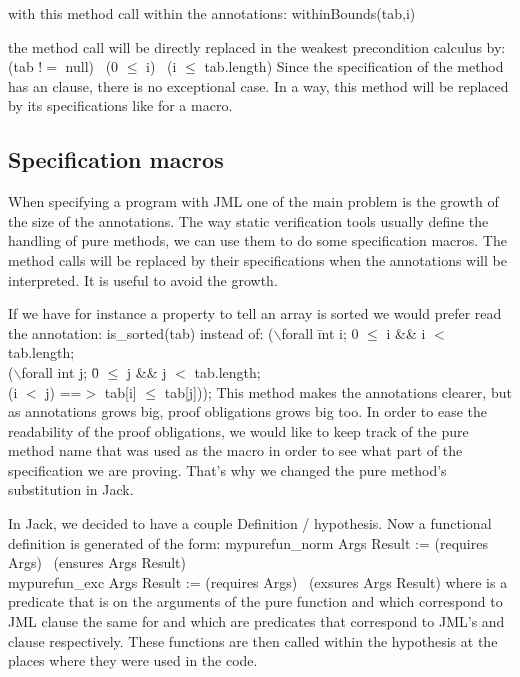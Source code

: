 with this method call within the annotations: 
\btab
withinBounds(tab,i)
\etab

the method call will be directly replaced in the weakest precondition calculus by:
\btab
(tab $!=$ null) \rarrow \ (0 $\le$ i) \conj \ (i $\le$ tab.length)
\etab
Since the specification
of the method has an  clause, there is no exceptional case.
In a way, this method will be replaced by its specifications like for a macro.



\subsection{Specification macros}


When specifying a program with JML one of the main problem is the 
growth of the size of the annotations. 
The way static verification tools usually define the handling 
of pure methods, we can use them to do some specification macros.
The method calls will be replaced by their specifications when the 
annotations will be interpreted. It is useful to avoid the growth.

If we have for instance a property to tell an array is sorted we would 
prefer read the annotation:
\btab
is\_sorted(tab)
\etab
instead of:
\btab
 ($\backslash$forall \=int i; 0 $\le$ i \&\& i $<$ tab.length;\+\\ 
 ($\backslash$forall int j; \=0 $\le$ j \&\& j $<$ tab.length; \+\\(i $<$ j) ==$>$ tab[i] $\le$ tab[j]));
\etab
This method makes the annotations clearer, but as annotations 
grows big, proof obligations grows big too. In order to ease the readability 
of the proof obligations, we would like to keep track of the pure method name
that was used as the macro in order to see what part of the specification we 
are proving. That's why we changed the pure method's substitution in Jack.

In Jack, we decided to have a couple Definition / hypothesis.
Now a functional definition is generated of the form:
\btab
mypurefun\_norm  Args Result := (requires Args) \rarrow \ (ensures Args Result)\\
mypurefun\_exc  Args Result := (requires Args) \rarrow \ (exsures Args Result)
\etab
where  is a predicate that is on the arguments of the pure function and 
which correspond to JML  clause the same for  and  
which are predicates that correspond to JML's  and  clause respectively.
These functions are then called within the hypothesis at the places where they were used in the code. 

